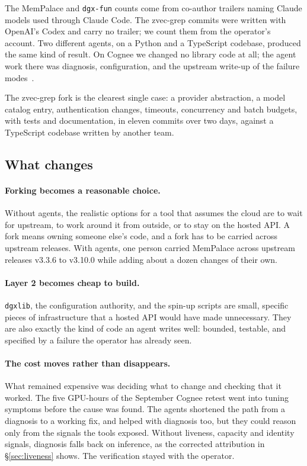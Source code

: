 \documentclass[11pt]{article}
\newcommand{\code}[1]{\texttt{#1}}
\begin{document}
The MemPalace and \code{dgx-fun} counts come from co-author trailers naming Claude models used
through Claude Code. The zvec-grep commits were written with OpenAI's Codex and carry no trailer; we
count them from the operator's account. Two different agents, on a Python and a TypeScript codebase,
produced the same kind of result. On Cognee we changed no library code at all; the agent work there
was diagnosis, configuration, and the upstream write-up of the failure modes~\cite{cognee3870}.

The zvec-grep fork is the clearest single case: a provider abstraction, a model catalog entry,
authentication changes, timeouts, concurrency and batch budgets, with tests and documentation, in
eleven commits over two days, against a TypeScript codebase written by another team.

\subsection{What changes}

\paragraph{Forking becomes a reasonable choice.} Without agents, the realistic options for a tool
that assumes the cloud are to wait for upstream, to work around it from outside, or to stay on the
hosted API. A fork means owning someone else's code, and a fork has to be carried across upstream
releases. With agents, one person carried MemPalace across upstream releases v3.3.6 to v3.10.0 while
adding about a dozen changes of their own.

\paragraph{Layer 2 becomes cheap to build.} \code{dgxlib}, the configuration authority, and the
spin-up scripts are small, specific pieces of infrastructure that a hosted API would have made
unnecessary. They are also exactly the kind of code an agent writes well: bounded, testable, and
specified by a failure the operator has already seen.

\paragraph{The cost moves rather than disappears.} What remained expensive was deciding what to
change and checking that it worked. The five GPU-hours of the September Cognee retest went into
tuning symptoms before the cause was found. The agents shortened the path from a diagnosis to a
working fix, and helped with diagnosis too, but they could reason only from the signals the tools
exposed. Without liveness, capacity and identity signals, diagnosis falls back on inference, as the
corrected attribution in \S\ref{sec:liveness} shows. The verification stayed with the operator.
\end{document}
